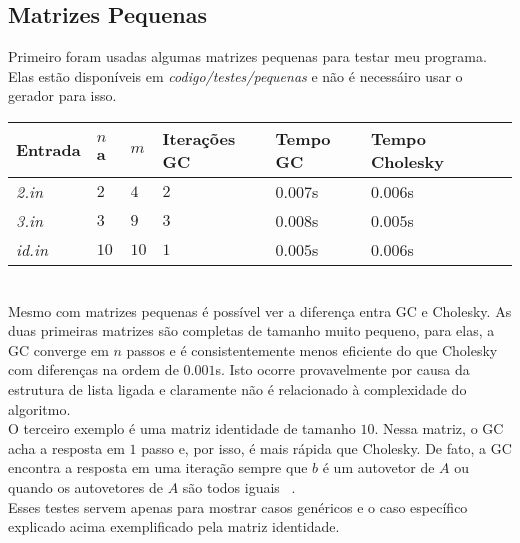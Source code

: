 \documentclass[
10pt, %
a4paper, %
oneside, %
headinclude,footinclude, %
BCOR5mm, %
]{scrartcl}
\begin{document}
\subsection{Matrizes Pequenas}
Primeiro foram usadas algumas matrizes pequenas para testar meu programa. Elas estão disponíveis em \textit{codigo/testes/pequenas} e não é necessáiro usar o gerador para isso. \\
\begin{tabular}{| l | l | l | l | l | l | l |}
    \hline
    Entrada & $n$a & $m$ & Iterações GC & Tempo GC & Tempo Cholesky \\ \hline
    \textit{2.in} & $2$ & $4$ & $2$ & $0.007$s & $0.006$s \\ \hline
    \textit{3.in} & $3$ & $9$ & $3$ & $0.008$s & $0.005$s \\ \hline
    \textit{id.in} & $10$ & $10$ & $1$ & $0.005$s & $0.006$s \\ \hline
\end{tabular} \\
Mesmo com matrizes pequenas é possível ver a diferença entra GC e Cholesky. As duas primeiras matrizes são completas de tamanho muito pequeno, para elas, a GC converge em $n$ passos e é consistentemente menos eficiente do que Cholesky com diferenças na ordem de $0.001$s. Isto ocorre provavelmente por causa da estrutura de lista ligada e claramente não é relacionado à complexidade do algoritmo. \\
O terceiro exemplo é uma matriz identidade de tamanho $10$. Nessa matriz, o GC acha a resposta em $1$ passo e, por isso, é mais rápida que Cholesky. De fato, a GC encontra a resposta em uma iteração sempre que $b$ é um autovetor de $A$ ou quando os autovetores de $A$ são todos iguais ~\cite[p.~33]{shewchuk1994introduction}. \\
Esses testes servem apenas para mostrar casos genéricos e o caso específico explicado acima exemplificado pela matriz identidade.
\end{document}
